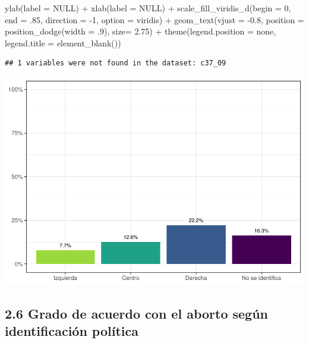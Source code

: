 \documentclass[
  12pt,
]{book}
\newenvironment{Shaded}{\begin{snugshade}}{\end{snugshade}}
\newcommand{\AttributeTok}[1]{\textcolor[rgb]{0.77,0.63,0.00}{#1}}
\newcommand{\ConstantTok}[1]{\textcolor[rgb]{0.00,0.00,0.00}{#1}}
\newcommand{\DecValTok}[1]{\textcolor[rgb]{0.00,0.00,0.81}{#1}}
\newcommand{\FloatTok}[1]{\textcolor[rgb]{0.00,0.00,0.81}{#1}}
\newcommand{\FunctionTok}[1]{\textcolor[rgb]{0.00,0.00,0.00}{#1}}
\newcommand{\NormalTok}[1]{#1}
\newcommand{\SpecialCharTok}[1]{\textcolor[rgb]{0.00,0.00,0.00}{#1}}
\newcommand{\StringTok}[1]{\textcolor[rgb]{0.31,0.60,0.02}{#1}}
\begin{document}
\begin{Shaded}
\begin{Highlighting}[]
    \FunctionTok{ylab}\NormalTok{(}\AttributeTok{label =} \ConstantTok{NULL}\NormalTok{) }\SpecialCharTok{+}
    \FunctionTok{xlab}\NormalTok{(}\AttributeTok{label =} \ConstantTok{NULL}\NormalTok{) }\SpecialCharTok{+}
    \FunctionTok{scale\_fill\_viridis\_d}\NormalTok{(}\AttributeTok{begin =} \DecValTok{0}\NormalTok{, }\AttributeTok{end =}\NormalTok{ .}\DecValTok{85}\NormalTok{, }\AttributeTok{direction =} \SpecialCharTok{{-}}\DecValTok{1}\NormalTok{, }\AttributeTok{option =} \StringTok{\textquotesingle{}viridis\textquotesingle{}}\NormalTok{) }\SpecialCharTok{+}
    \FunctionTok{geom\_text}\NormalTok{(}\AttributeTok{vjust =} \SpecialCharTok{{-}}\FloatTok{0.8}\NormalTok{,}
              \AttributeTok{position =} \FunctionTok{position\_dodge}\NormalTok{(}\AttributeTok{width =}\NormalTok{ .}\DecValTok{9}\NormalTok{),}
              \AttributeTok{size=} \FloatTok{2.75}\NormalTok{) }\SpecialCharTok{+}
    \FunctionTok{theme}\NormalTok{(}\AttributeTok{legend.position =} \StringTok{\textquotesingle{}none\textquotesingle{}}\NormalTok{,   }
          \AttributeTok{legend.title =} \FunctionTok{element\_blank}\NormalTok{())}
\end{Highlighting}
\end{Shaded}

\begin{verbatim}
## 1 variables were not found in the dataset: c37_09
\end{verbatim}

\includegraphics{reporte-elsoc_files/figure-latex/unnamed-chunk-19-1.pdf}

\hypertarget{grado-de-acuerdo-con-el-aborto-seguxfan-identificaciuxf3n-poluxedtica}{%
\subsection{2.6 Grado de acuerdo con el aborto según identificación política}\label{grado-de-acuerdo-con-el-aborto-seguxfan-identificaciuxf3n-poluxedtica}}
\end{document}
